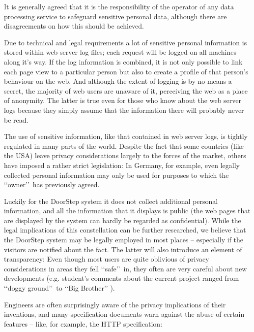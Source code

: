 \documentclass[a4paper]{danarticle}
\theoremstyle{remark}
\begin{document}
    It is generally agreed that it is the 
    responsibility of the operator of any data processing service to safeguard 
    sensitive personal data, although there are disagreements on how this should
    be achieved.
    
    Due to technical and legal requirements a lot of sensitive personal 
    information is stored within web server log files; each request will be 
    logged on all machines along it's way. If the log information is 
    combined, it is not only possible to link each page view to a particular 
    person but also to create a profile of that person's behaviour on the web. 
    And although the extent of logging is by no means a secret, the majority 
    of web users are unaware of it, perceiving the web as a place of anonymity.
    The latter is true even for those who know about the web server logs because
    they simply assume that the information there will probably never be read.
    
    The use of sensitive information, like that contained in web server logs,
    is tightly regulated in many parts of the world. Despite the fact 
    that some countries (like the USA) leave privacy considerations largely to 
    the forces of the market, others have imposed a rather strict legislation: 
    In Germany, for example, even legally collected personal information may 
    only be used for purposes to which the \lq\lq owner\rq\rq\ has previously
    agreed. 
    
    Luckily for the DoorStep system it does not collect additional personal
    information, and all the information that it displays is public 
    (the web pages that are displayed by the system can hardly be 
    regarded as confidential). While the legal implications of this
    constellation can be further researched, we believe that the DoorStep system
    may be legally employed in most places -- especially if the visitors are
    notified about the fact. The latter will also introduce an element of
    transparency:  Even though most users are quite oblivious of privacy 
    considerations in areas they fell \lq\lq safe\rq\rq\ in, they often are very 
    careful about new developments (e.g. student's comments about the current 
    project ranged from \lq\lq doggy ground\rq\rq\ to \lq\lq Big Brother\rq\rq 
    ).
    
    Engineers are often surprisingly aware of the privacy implications of their 
    inventions, and many specification documents warn against the abuse of 
    certain features -- like, for example, the HTTP specification\cite{http}:
    
\end{document}
